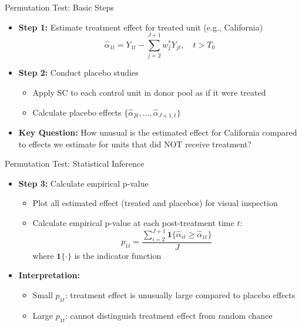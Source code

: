\documentclass[dvipsnames,hyperref={pdfpagelabels=false}]{beamer}
\begin{document}
\begin{frame}{Permutation Test: Basic Steps}
	\begin{itemize}
		\item \textbf{Step 1:} Estimate treatment effect for treated unit (e.g., California)
		\begin{equation*}
			\hat{\alpha}_{1t} = Y_{1t} - \sum_{j=2}^{J+1} w_j^* Y_{jt}, \quad t > T_0
\end{equation*}
		\vspace{0.2cm}
		\item \textbf{Step 2:} Conduct placebo studies
				\vspace{0.2cm}
		\begin{itemize}
			\item Apply SC to each control unit in donor pool as if it were treated
					\vspace{0.2cm}
			\item Calculate placebo effects $\{\hat{\alpha}_{2t},...,\hat{\alpha}_{J+1,t}\}$
		\end{itemize}
		\vspace{0.2cm}
		\item \textbf{Key Question:} How unusual is the estimated effect for California compared to effects we estimate for units that did NOT receive treatment?
	\end{itemize}
\end{frame}

\begin{frame}{Permutation Test: Statistical Inference}
	\begin{itemize}
		\item \textbf{Step 3:} Calculate empirical p-value
		\begin{itemize}
			\item Plot all estimated effect (treated and placebos) for visual inspection
			\vspace{0.2cm}
			\item Calculate empirical p-value at each post-treatment time $t$:
			\begin{equation*}
				p_{1t}=\dfrac{\sum^{J+1}_{i=2}\mathbf{1}\{\hat{\alpha}_{it}\geq\hat{\alpha}_{1t}\}}{J}
\end{equation*}
			where $\mathbf{1}\{\cdot\}$ is the indicator function
		\end{itemize}
		\vspace{0.2cm}
		\item \textbf{Interpretation:} 
		\begin{itemize}
			\item Small $p_{1t}$: treatment effect is unusually large compared to placebo effects
					\vspace{0.2cm}
			\item Large $p_{1t}$: cannot distinguish treatment effect from random chance
		\end{itemize}
	\end{itemize}
\end{frame}
\end{document}
